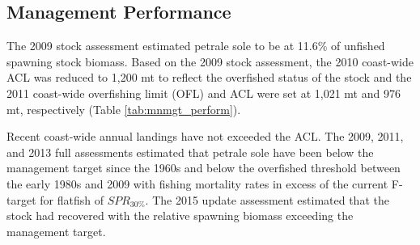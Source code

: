 \documentclass[12pt,]{article}
\begin{document}
\FloatBarrier

\subsection*{Management Performance}\label{management-performance}

The 2009 stock assessment estimated petrale sole to be at 11.6\% of
unfished spawning stock biomass. Based on the 2009 stock assessment, the
2010 coast-wide ACL was reduced to 1,200 mt to reflect the overfished
status of the stock and the 2011 coast-wide overfishing limit (OFL) and
ACL were set at 1,021 mt and 976 mt, respectively (Table
\ref{tab:mnmgt_perform}).

Recent coast-wide annual landings have not exceeded the ACL. The 2009,
2011, and 2013 full assessments estimated that petrale sole have been
below the management target since the 1960s and below the overfished
threshold between the early 1980s and 2009 with fishing mortality rates
in excess of the current F-target for flatfish of \(SPR_{30\%}\). The
2015 update assessment estimated that the stock had recovered with the
relative spawning biomass exceeding the management target.

\begin{table}[ht]
\centering
\caption{Recent trend in total catch and  
                              landings (mt) relative to the management guidelines. 
                              Estimated total catch reflect the landings 
                              plus the model estimated discarded biomass based on discard rate data.} 
\label{tab:mnmgt_perform}
\end{table}
\end{document}
